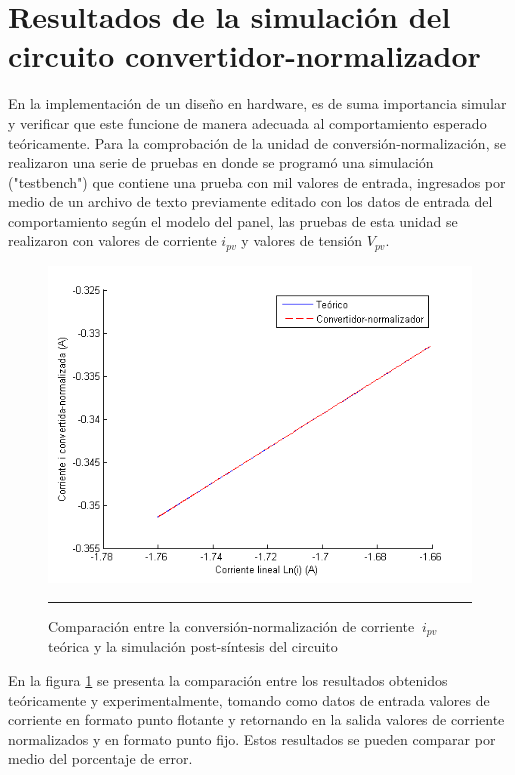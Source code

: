\section{Resultados de la simulación del circuito convertidor-normalizador}

En la implementación de un diseño en hardware, es de suma importancia simular y verificar que este funcione de manera adecuada al comportamiento esperado teóricamente. Para la comprobación de la unidad de conversión-normalización, se realizaron una serie de pruebas en donde se programó una simulación ("testbench") que contiene una prueba con mil valores de entrada, ingresados por medio de un archivo de texto previamente editado con los datos de entrada del comportamiento según el modelo del panel, las pruebas de esta unidad se realizaron con valores de corriente $ i_{pv}$ y valores de tensión $ V_{pv}$. 


  \begin{figure}[H]
  \centering
    \includegraphics[scale=0.7]{./Convertidor-normalizador_I.png}
    \rule{35em}{0.5pt}
  \caption[Comparación entre la conversión-normalización de corriente $\ i_{pv}$ teórica y la simulación post-síntesis del circuito]{Comparación entre la conversión-normalización de corriente $\ i_{pv}$ teórica y la simulación post-síntesis del circuito}
  \label{fig:NORMI}
\end{figure}

En la figura \ref{fig:NORMI} se presenta la comparación entre los resultados obtenidos teóricamente y experimentalmente, tomando como datos de entrada  valores de corriente en formato punto flotante y retornando en la salida valores de corriente normalizados y en formato punto fijo. Estos resultados se pueden comparar por medio del porcentaje de error.  

